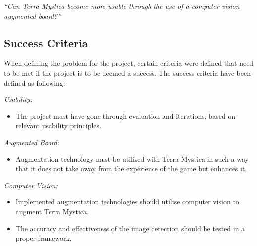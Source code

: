 \textit{“Can Terra Mystica become more usable through the use of a computer vision augmented board?”}

\subsection{Success Criteria}
When defining the problem for the project, certain criteria were defined that need to be met if the project is to be deemed a success. The success criteria have been defined as following:

\textit{Usability:}
\begin{itemize}
	\item The project must have gone through evaluation and iterations, based on relevant usability principles.
\end{itemize}
\textit{Augmented Board:}
\begin{itemize}
	\item Augmentation technology must be utilised with Terra Mystica in such a way that it does not take away from the experience of the game but enhances it.
\end{itemize}
\textit{Computer Vision:}
\begin{itemize}
	\item Implemented augmentation technologies should utilise computer vision to augment Terra Mystica.
	\item The accuracy and effectiveness of the image detection should be tested in a proper framework.
\end{itemize} 